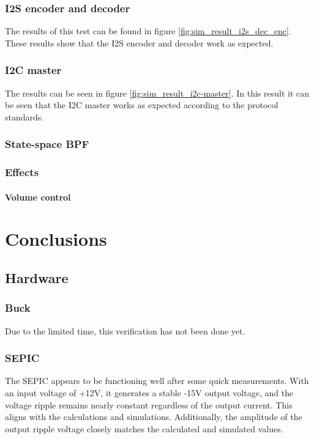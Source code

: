 \subsubsection{I2S encoder and decoder}
The results of this test can be found in figure \ref{fig:sim_result_i2s_dec_enc}. These results show that the I2S encoder and decoder work as expected. 

\subsubsection{I2C master}
The results can be seen in figure \ref{fig:sim_result_i2c-master}. In this result it can be seen that the I2C master works as expected according to the protocol standards.

\subsubsection{State-space BPF}

\subsubsection{Effects}
\paragraph{Volume control}

\section{Conclusions}

\subsection{Hardware}

\subsubsection{Buck}
Due to the limited time, this verification has not been done yet.

\subsubsection{SEPIC}
The SEPIC appears to be functioning well after some quick measurements. With an input voltage of +12V, it generates a stable -15V output voltage, and the voltage ripple remains nearly constant regardless of the output current. This aligns with the calculations and simulations. Additionally, the amplitude of the output ripple voltage closely matches the calculated and simulated values.

